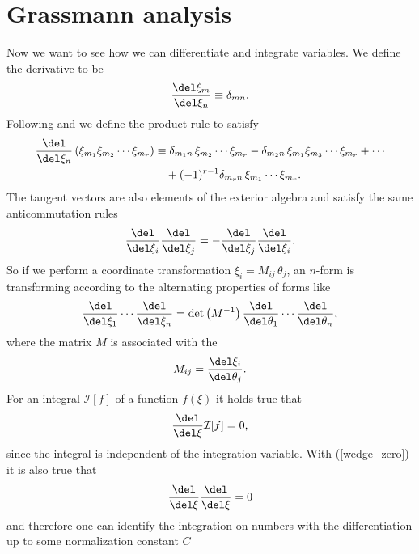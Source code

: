 \section{Grassmann analysis} \label{sec: grassmann_analysis}
Now we want to see how we can differentiate and integrate  variables. We define the derivative to be
\begin{equation}
\dfrac{\del \xi_{m}}{\del\xi_{n}}\equiv\delta_{m n} .
\end{equation}
Following \cite{Cartier:2002zp} and \cite{Berezin} we define the product rule to satisfy
\begin{align}
\dfrac{\del }{\del\xi_{n}} \left(\xi_{m_{1}}\xi_{m_{2}}\cdots \xi_{m_{r}}\right) &\equiv \delta_{m_{1} n}\,\xi_{m_{2}}\cdots\xi_{m_{r}}-\delta_{m_{2} n}\,\xi_{m_{1}} \xi_{m_{3}}\cdots \xi_{m_{r}} +\cdots  \notag \\
&\quad + (-1)^{r-1} \delta_{m_{r} n}\,\xi_{m_{1}}\cdots \xi_{m_{r}}.
\end{align}
The tangent vectors are also elements of the exterior algebra and satisfy the same anticommutation rules
\begin{equation}
\frac{\del }{\del \xi_{i}} \frac{\del }{\del\xi_{j}} = - \frac{\del }{\del \xi_{j}} \frac{\del }{\del\xi_{i}}.
\end{equation}
%
%
So if we perform a coordinate transformation $\xi_{i}=M_{ij}\,\theta_{j}$, an $n$-form is transforming according to the alternating properties of forms like
\begin{equation}
\frac{\del }{\del \xi_{1}}\cdots\frac{\del }{\del \xi_{n}} = \mathrm{det}\left(M^{-1}\right) \frac{\del }{\del \theta_{1}}\cdots \frac{\del }{\del \theta_{n}},
\label{coord_trafo}
\end{equation}
where the matrix $M$ is associated with the 
\begin{equation}
M_{ij}=\frac{\del \xi_{i}}{\del\theta_{j}}.
\end{equation}
For an integral $\mathcal{I}[f]$ of a function $f(\xi)$ it holds true that
\begin{equation}
\dfrac{\del}{\del \xi}\mathcal{I}[f] =0,
\end{equation}
since the integral is independent of the integration variable. With (\ref{wedge_zero}) it is also true that
\begin{equation}
\dfrac{\del}{\del \xi}\dfrac{\del}{\del \xi}=0
\end{equation}
and therefore one can identify the integration on  numbers with the differentiation up to some normalization constant $C$
